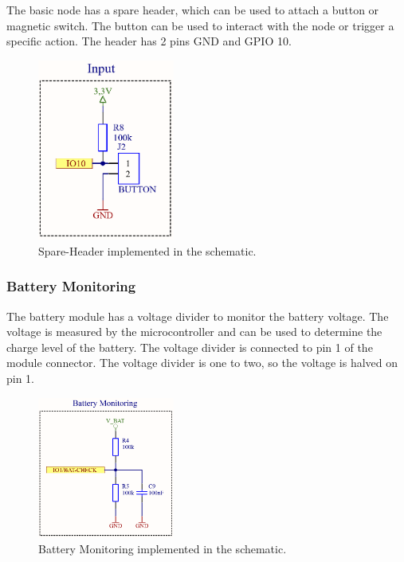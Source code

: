         The basic node has a spare header, which can be used to attach a button or 
        magnetic switch. The button can be used to interact with the node or trigger
        a specific action. The header has 2 pins GND and GPIO 10.

        \begin{figure}[H]
            \centering
            \includegraphics[width=0.4\textwidth]{assets/HW/NodeV2.2-Input.png}
            \caption{Spare-Header implemented in the schematic.}
        \end{figure}


    \subsubsection{Battery Monitoring}

        The battery module has a voltage divider to monitor the battery voltage. 
        The voltage is measured by the microcontroller and can be used to determine
        the charge level of the battery. The voltage divider is connected to pin 1 of the 
        module connector. The voltage divider is one to two, so the voltage is halved on pin 1.

        \begin{figure}[H]
            \centering
            \includegraphics[width=0.4\textwidth]{assets/HW/NodeV2.2-Battery-Check.png}
            \caption{Battery Monitoring implemented in the schematic.}
        \end{figure}

